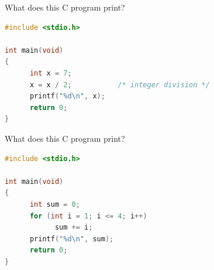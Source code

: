 \documentclass{exam}
\newcounter{savedq}
\newcommand{\qrestore}{\setcounter{question}{\value{savedq}}}
\begin{document}
\begin{questions}
\qrestore
\question What does this C program print?

\begin{lstlisting}[language=C]
#include <stdio.h>

int main(void)
{
      int x = 7;
      x = x / 2;           /* integer division */
      printf("%d\n", x);
      return 0;
}
\end{lstlisting}

\begin{choices}
\end{choices}

\question What does this C program print?

\begin{lstlisting}[language=C]
#include <stdio.h>

int main(void)
{
      int sum = 0;
      for (int i = 1; i <= 4; i++)
            sum += i;
      printf("%d\n", sum);
      return 0;
}
\end{lstlisting}

\begin{choices}
\end{choices}

\end{questions}
\end{document}
